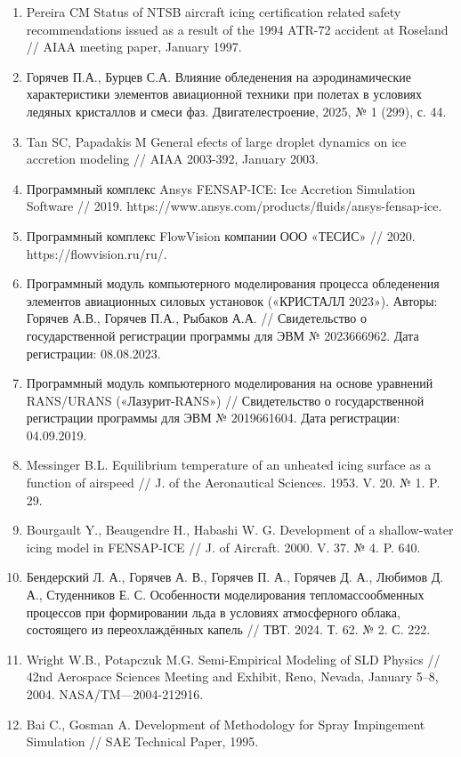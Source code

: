 \documentclass{psta}%
\begin{document}
\begin{enumerate}
\item Pereira CM Status of NTSB aircraft icing certification related safety recommendations issued as a result of the 1994 ATR-72 accident at Roseland // AIAA meeting paper, January 1997.
\item Горячев П.А., Бурцев С.А. Влияние обледенения на аэродинамические характеристики элементов авиационной техники при полетах в условиях ледяных кристаллов и смеси фаз. Двигателестроение, 2025, № 1 (299), с. 44.
\item Tan SC, Papadakis M General efects of large droplet dynamics on ice accretion modeling // AIAA 2003-392, January 2003.
\item Программный комплекс Ansys FENSAP-ICE: Ice Accretion Simulation Software // 2019. https://www.ansys.com/products/fluids/ansys-fensap-ice.
\item Программный комплекс FlowVision компании ООО «ТЕСИС» // 2020. https://flowvision.ru/ru/.
\item Программный модуль компьютерного моделирования процесса обледенения элементов авиационных силовых установок («КРИСТАЛЛ 2023»). Авторы: Горячев А.В., Горячев П.А., Рыбаков А.А. // Свидетельство о государственной регистрации программы для ЭВМ № 2023666962. Дата регистрации: 08.08.2023.
\item Программный модуль компьютерного моделирования на основе уравнений RANS/URANS («Лазурит-RАNS») // Свидетельство о государственной регистрации программы для ЭВМ № 2019661604. Дата регистрации: 04.09.2019.
\item Messinger B.L. Equilibrium temperature of an unheated icing surface as a function of airspeed // J. of the Aeronautical Sciences. 1953. V. 20. № 1. P. 29.
\item Bourgault Y., Beaugendre H., Habashi W. G. Development of a shallow-water icing model in FENSAP-ICE // J. of Aircraft. 2000. V. 37. № 4. P. 640.
\item Бендерский Л. А., Горячев А. В., Горячев П. А., Горячев Д. А., Любимов Д. А., Студенников Е. С. Особенности моделирования тепломассообменных процессов при формировании льда в условиях атмосферного облака, состоящего из переохлаждённых капель // ТВТ. 2024. Т. 62. № 2. С. 222.
\item Wright W.B., Potapczuk M.G. Semi-Empirical Modeling of SLD Physics // 42nd Aerospace Sciences Meeting and Exhibit, Reno, Nevada, January 5–8, 2004. NASA/TM—2004-212916.
\item Bai C., Gosman A. Development of Methodology for Spray Impingement Simulation // SAE Technical Paper, 1995.

\end{enumerate}
\end{document}
